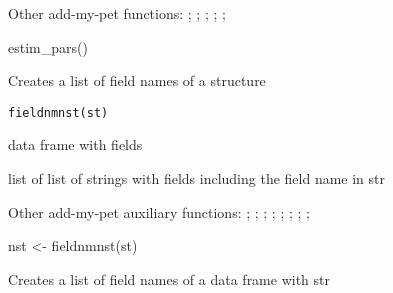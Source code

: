 \documentclass[a4paper]{book}
\begin{document}
%
\begin{SeeAlso}\relax
Other add-my-pet functions: ;
; ;
; ;
\end{SeeAlso}
%
\begin{Examples}
\begin{ExampleCode}
estim_pars()
\end{ExampleCode}
\end{Examples}
%
\begin{Description}\relax
Creates a list of field names of a structure
\end{Description}
%
\begin{Usage}
\begin{verbatim}
fieldnmnst(st)
\end{verbatim}
\end{Usage}
%
\begin{Arguments}
\begin{ldescription}
\item[\code{st}] data frame with fields
\end{ldescription}
\end{Arguments}
%
\begin{Value}
list of list of strings with fields including the field name in str
\end{Value}
%
\begin{SeeAlso}\relax
Other add-my-pet auxiliary functions: ;
; ;
; ;
;
;
; 
\end{SeeAlso}
%
\begin{Examples}
\begin{ExampleCode}
nst <- fieldnmnst(st)
\end{ExampleCode}
\end{Examples}
%
\begin{Description}\relax
Creates a list of field names of a data frame with str
\end{Description}
\end{document}
